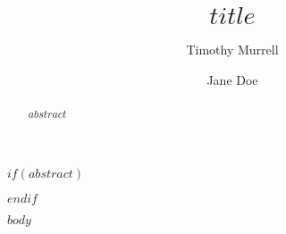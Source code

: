 \documentclass[5p]{elsarticle}
\begin{document}
\begin{frontmatter}

\title{$title$}

\author[1,2]{Timothy Murrell\href{https://orcid.org/0000-0001-2345-6789}{}}
\author[2]{Jane Doe\href{https://orcid.org/0000-0002-9876-5432}{}}

\address[1]{African Plant Nutrition Institute}
\address[2]{Université Mohamed VI Polytechnique}

$if(abstract)$
\begin{abstract}
$abstract$
\end{abstract}
$endif$

\end{frontmatter}

$body$
\end{document}
